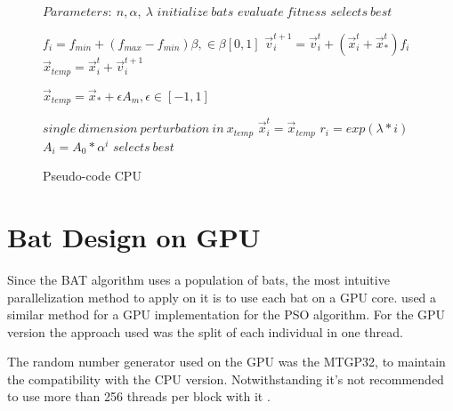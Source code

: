 \documentclass[conference]{IEEEtran}
\begin{document}
\begin{figure}
\begin{algorithmic}[1]
\State $Parameters:\ n,\alpha,\ \lambda$
\State $initialize\ bats$
\State $evaluate\ fitness$
\State $selects\ best$

        \State $f_i=f_{min} + (f_{max} - f_{min})\beta, \in \beta [0,1]$
        \State $\vec{v}_i^{t+1} = \vec{v}_i^{t} + (\vec{x}_i^{t} + \vec{x}_*^{t})f_i$
        \State $\vec{x}_{temp} = \vec{x}_i^{t} + \vec{v}_i^{t+1}$


            \State $\vec{x}_{temp} = \vec{x}_* + \epsilon A_m, \epsilon \in [-1, 1]$
        \EndIf

        \State $single\ dimension\ perturbation\ in\ x_{temp}$
            \State $\vec{x}_i^t = \vec{x}_{temp}$
            \State $r_i = exp(\lambda * i)$
            \State $A_i =  A_{0} * \alpha^i$
        \EndIf
        \State $selects\ best$
    \EndFor
\EndWhile
\end{algorithmic}
\caption{Pseudo-code CPU}\label{GPU}
\end{figure}


\section{Bat Design on GPU}

Since the BAT algorithm uses a population of bats, the most intuitive
parallelization method to apply on it is to use each bat on a GPU core.
\cite{pso-gpu} used a similar method for a GPU implementation for the PSO algorithm.
For the GPU version the approach used was the split of each individual in one thread.

The random number generator used on the GPU was the MTGP32, to
maintain the compatibility with the CPU version. Notwithstanding it's
not recommended to use more than 256 threads per block with it
\cite{curandIssue}.
\end{document}
